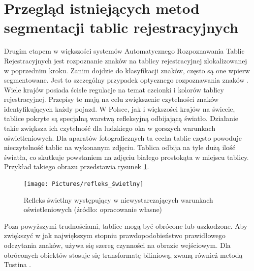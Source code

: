 \section{Przegląd istniejących metod segmentacji tablic rejestracyjnych}

Drugim etapem w większości systemów Automatycznego Rozpoznawania Tablic Rejestracyjnych jest rozpoznanie znaków na tablicy rejestracyjnej zlokalizowanej w poprzednim kroku.
Zanim dojdzie do klasyfikacji znaków, często są one wpierw segmentowane.
Jest to szczególny przypadek optycznego rozpoznawania znaków \cite{9310202}.
Wiele krajów posiada ścisłe regulacje na temat czcionki i kolorów tablicy rejestracyjnej.
Przepisy te mają na celu zwiększenie czytelności znaków identyfikujących każdy pojazd.
W Polsce, jak i większości krajów na świecie, tablice pokryte są specjalną warstwą refleksyjną odbijającą światło.
Działanie takie zwiększa ich czytelność dla ludzkiego oka w gorszych warunkach oświetleniowych.
Dla aparatów fotograficznych ta cecha tablic często powoduje nieczytelność tablic na wykonanym zdjęciu.
Tablica odbija na tyle dużą ilość światła, co skutkuje powstaniem na zdjęciu białego prostokąta w miejscu tablicy.
Przykład takiego obrazu przedstawia rysunek \ref{fig:refleks_swietlny}.
\begin{figure}[!ht]
    \centering
    \texttt{[image: Pictures/refleks\_świetlny]}
    \caption{Refleks świetlny występujący w niewystarczających warunkach oświetleniowych (źródło: opracowanie własne)}
    \label{fig:refleks_swietlny}
\end{figure}
\FloatBarrier
Poza powyższymi trudnościami, tablice mogą być obrócone lub uszkodzone.
Aby zwiększyć w jak największym stopniu prawdopodobieństwo prawidłowego odczytania znaków, używa się szereg czynności na obrazie wejściowym.
Dla obróconych obiektów stosuje się transformatę biliniową, zwaną również metodą Tustina \cite{Xu2006AMO}.

